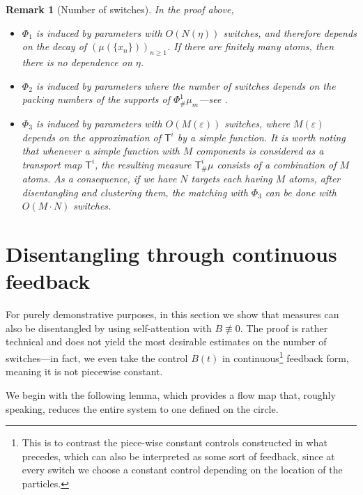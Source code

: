 \documentclass[a4paper,11pt]{article}
\theoremstyle{plain}
\newtheorem{remark}[theorem]{Remark}
\newcommand{\bB}{\bm{\mathit{B}}}
\renewcommand{\geq}{\geqslant}
\numberwithin{equation}{section}
\begin{document}
\begin{remark}[Number of switches]
    In the proof above,
    \begin{itemize}
        \item $\Phi_1$ is induced by parameters with $O(N(\eta))$ switches, and therefore depends on the decay of $(\mu(\{x_n\}))_{n\geq1}$. If there are finitely many atoms, then there is no dependence on $\eta$.
        \item $\Phi_2$ is induced by parameters where the number of switches depends on the packing numbers of the supports of $\Phi^1_\#\mu_m$---see .
        \item $\Phi_3$ is induced by parameters with  $O(M(\varepsilon))$ switches, where $M(\varepsilon)$ depends on the approximation of $\mathsf{T}^i$ by a simple function. It is worth noting that whenever a simple function with $M$ components is considered as a transport map $\mathsf{T}^i$, the resulting measure $\mathsf{T}^i_\#\mu$ consists of a combination of $M$ atoms. As a consequence, if we have $N$ targets each having $M$ atoms, after disentangling and clustering them, the matching with $\Phi_3$ can be done with $O(M \cdot N)$ switches.
    \end{itemize}
\end{remark}






\section{Disentangling through continuous feedback} \label{sec: beyond.the.average}

For purely demonstrative purposes, in this section we show that measures can also be disentangled by using self-attention with $\bB\not\equiv0$. The proof is rather technical and does not yield the most desirable estimates on the number of switches---in fact, we even take the control $\bB(t)$ in continuous\footnote{This is to contrast the piece-wise constant controls constructed in what precedes, which can also be interpreted as some sort of feedback, since at every switch we choose a constant control depending on the location of the particles.} feedback form, meaning it is not piecewise constant.


We begin with the following lemma, which provides a flow map that, roughly speaking, reduces the entire system to one defined on the circle.
\end{document}

